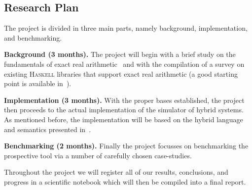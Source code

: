 \documentclass[a4paper, 11pt]{article}
\begin{document}
\smallskip
\noindent

\subsection*{Research Plan}

The project is divided in three main parts, namely background, implementation, and
benchmarking.

\noindent
\textbf{Background (3 months).}
The project will begin with a brief study on  the fundamentals of exact real
arithmetic~\cite{plume98,geuvers07,bridger19} and with the compilation of a
survey on existing \textsc{Haskell} libraries that support exact real
arithmetic (a good starting point is available in~\cite{konecny22}).

\noindent
\textbf{Implementation (3 months).} 
With the proper bases established, the project then proceeds to the
actual implementation of the simulator of hybrid systems.  As mentioned before, the
implementation will be based on the hybrid language and semantics presented
in~\cite{goncharov2020}.

\noindent
\textbf{Benchmarking (2 months).} 
Finally the project focusses on benchmarking the prospective tool via a
number of carefully chosen case-studies. 

Throughout the project we will register all of our results, conclusions, and
progress in a scientific notebook which will then be compiled into a final
report.



\end{document}
